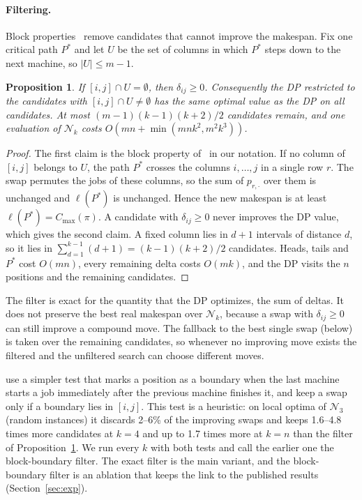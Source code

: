\documentclass[letterpaper]{article} %
\newtheorem{proposition}{Proposition}
\theoremstyle{definition}
\newcommand{\N}{\mathcal{N}}
\begin{document}
\paragraph{Filtering.} Block properties~\cite{nowicki1996,grabowski2004}
remove candidates that cannot improve the makespan. Fix one critical path
$P^\ast$ and let $U$ be the set of columns in which $P^\ast$ steps down
to the next machine, so $|U|\leq m-1$.

\begin{proposition}\label{prop:filter}
If $[i,j]\cap U=\emptyset$, then $\delta_{ij}\geq 0$. Consequently the DP
restricted to the candidates with $[i,j]\cap U\neq\emptyset$ has the same
optimal value as the DP on all candidates. At most
$(m-1)(k-1)(k+2)/2$ candidates remain, and one evaluation of $\N_k$
costs $O(mn+\min(mnk^2,m^2k^3))$.
\end{proposition}
\begin{proof}
The first claim is the block property
of~\cite{nowicki1996,grabowski2004} in our notation. If no column of
$[i,j]$ belongs to $U$, the path $P^\ast$ crosses the
columns $i,\dots,j$ in a single row $r$. The swap permutes the jobs of
these columns, so the sum of $p_{r,\cdot}$ over them is unchanged and
$\ell(P^\ast)$ is unchanged. Hence the new makespan is at least
$\ell(P^\ast)=C_{\max}(\pi)$. A candidate with $\delta_{ij}\geq 0$ never
improves the DP value, which gives the second claim. A fixed column lies
in $d+1$ intervals of distance $d$, so it lies in
$\sum_{d=1}^{k-1}(d+1)=(k-1)(k+2)/2$ candidates. Heads, tails and
$P^\ast$ cost $O(mn)$, every remaining delta costs $O(mk)$, and the DP
visits the $n$ positions and the remaining candidates.
\end{proof}

The filter is exact for the quantity that the DP optimizes, the sum of
deltas. It does not preserve the best real makespan over $\N_k$, because
a swap with $\delta_{ij}\geq 0$ can still improve a compound move. The
fallback to the best single swap (below) is taken over the remaining
candidates, so whenever no improving move exists the filtered and the unfiltered search can
choose different moves.

\citet{wojewodzki2026windowed} use a simpler test that marks a
position as a boundary when the last machine starts a job immediately
after the previous machine finishes it, and keep a swap only if a
boundary lies in $[i,j]$. This test is a heuristic: on local optima of $\N_3$ (random instances) it
discards 2--6\% of the improving swaps and keeps 1.6--4.8 times more
candidates at $k=4$ and up to 1.7 times more at $k=n$ than the filter of
Proposition~\ref{prop:filter}. We run every $k$
with both tests and call the earlier one the block-boundary filter. The
exact filter is the main variant, and the block-boundary filter is an
ablation that keeps the link to the published results
(Section~\ref{sec:exp}).
\end{document}
